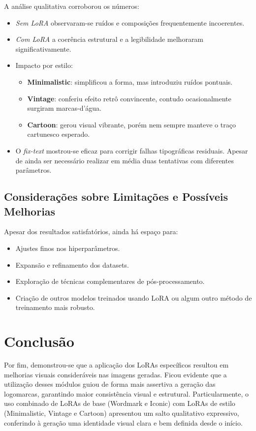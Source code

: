 \documentclass[12pt, %
openright, 
oneside, %
a4paper,    %
brazil]{facom-ufu-abntex2}
\begin{document}
A análise qualitativa corroborou os números:

\begin{itemize}
    \item \emph{Sem LoRA} observaram-se ruídos e composições frequentemente incoerentes.
    \item \emph{Com LoRA} a coerência estrutural e a legibilidade melhoraram significativamente.
    \item Impacto por estilo:
    \begin{itemize}
        \item \textbf{Minimalistic}: simplificou a forma, mas introduziu ruídos pontuais.
        \item \textbf{Vintage}: conferiu efeito retrô convincente, contudo ocasionalmente surgiram marcas-d’água.
        \item \textbf{Cartoon}: gerou visual vibrante, porém nem sempre manteve o traço cartunesco esperado.
    \end{itemize}
    \item O \emph{fix-text} mostrou-se eficaz para corrigir falhas tipográficas residuais. Apesar de ainda ser necessário realizar em média duas tentativas com diferentes parâmetros.
\end{itemize}

\section{Considerações sobre Limitações e Possíveis Melhorias}

Apesar dos resultados satisfatórios, ainda há espaço para:

\begin{itemize}
    \item Ajustes finos nos hiperparâmetros.
    \item Expansão e refinamento dos datasets.
    \item Exploração de técnicas complementares de pós-processamento.
    \item Criação de outros modelos treinados usando LoRA ou algum outro método de treinamento mais robusto.
\end{itemize}



\chapter[Conclusão]{Conclusão}
Por fim, demonstrou-se que a aplicação dos LoRAs específicos resultou em melhorias visuais consideráveis nas imagens geradas. Ficou evidente que a utilização desses módulos guiou de forma mais assertiva a geração das logomarcas, garantindo maior consistência visual e estrutural. Particularmente, o uso combinado de LoRAs de base (Wordmark e Iconic) com LoRAs de estilo (Minimalistic, Vintage e Cartoon) apresentou um salto qualitativo expressivo, conferindo à geração uma identidade visual clara e bem definida desde o início.
\end{document}
